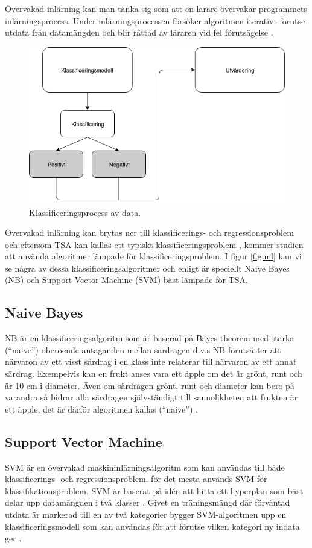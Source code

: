 \documentclass{kaumasters} %
\begin{document}
Övervakad inlärning kan man tänka sig som att en lärare övervakar programmets inlärningsprocess. Under inlärningsprocessen försöker algoritmen iterativt förutse utdata från datamängden och blir rättad av läraren vid fel förutsägelse \cite{learning:001}.

\begin{figure}[h]
\includegraphics[width=12cm]{klassmodell}
\centering
\caption{Klassificeringsprocess av data.}
\label{fig:kl}
\end{figure}

Övervakad inlärning kan brytas ner till klassificerings- och regressionsproblem och eftersom TSA kan kallas ett typiskt klassificeringsproblem \cite{SAsurvey}, kommer studien att använda algoritmer lämpade för klassificeringsproblem. I figur \ref{fig:ml} kan vi se några av dessa klassificeringsalgoritmer och enligt \cite{TSAsurvey} är speciellt Naive Bayes (NB) och Support Vector Machine (SVM)  bäst lämpade för TSA.

\subsection{Naive Bayes} \label{MLnb}
NB är en klassificeringsalgoritm som är baserad på Bayes theorem \cite{wiki:009} med starka (“naive”) oberoende antaganden mellan särdragen d.v.s NB förutsätter att närvaron av ett visst särdrag i en klass inte relaterar till närvaron av ett annat särdrag. 
Exempelvis kan en frukt anses vara ett äpple om det är grönt, runt och är 10 cm i diameter. Även om särdragen grönt, runt och diameter kan bero på varandra så bidrar alla särdragen självständigt till sannolikheten att frukten är ett äpple, det är därför algoritmen kallas (“naive”) \cite{nb:001}.

\subsection{Support Vector Machine} \label{MLsvm}
SVM är en övervakad maskininlärningsalgoritm som kan användas till både klassificerings- och regressionsproblem, för det mesta används SVM för klassifikationsproblem. SVM är baserat på idén att hitta ett hyperplan \cite{svm:001} som bäst delar upp datamängden i två klasser \cite{svm:003}. Givet en träningsmängd där förväntad utdata är markerad till en av två kategorier bygger SVM-algoritmen upp en klassificeringsmodell som kan användas för att förutse vilken kategori ny indata ger \cite{svm:002}. 
\end{document}
